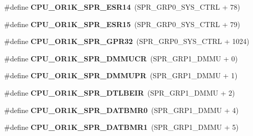 \begin{DoxyCompactItemize}
\item 
\mbox{\label{or1k-utility_8h_ad200a1bd430130a1178215266e691ea8}} 
\#define {\bfseries C\+P\+U\+\_\+\+O\+R1\+K\+\_\+\+S\+P\+R\+\_\+\+E\+S\+R14}~(S\+P\+R\+\_\+\+G\+R\+P0\+\_\+\+S\+Y\+S\+\_\+\+C\+T\+RL + 78)
\item 
\mbox{\label{or1k-utility_8h_aae305c736cae02eecc98ce655c6412f7}} 
\#define {\bfseries C\+P\+U\+\_\+\+O\+R1\+K\+\_\+\+S\+P\+R\+\_\+\+E\+S\+R15}~(S\+P\+R\+\_\+\+G\+R\+P0\+\_\+\+S\+Y\+S\+\_\+\+C\+T\+RL + 79)
\item 
\mbox{\label{or1k-utility_8h_a8c2ec7ea44f2972554cf9e69989b4008}} 
\#define {\bfseries C\+P\+U\+\_\+\+O\+R1\+K\+\_\+\+S\+P\+R\+\_\+\+G\+P\+R32}~(S\+P\+R\+\_\+\+G\+R\+P0\+\_\+\+S\+Y\+S\+\_\+\+C\+T\+RL + 1024)
\item 
\mbox{\label{or1k-utility_8h_a68d565f91b162e3b892d55a55a859e96}} 
\#define {\bfseries C\+P\+U\+\_\+\+O\+R1\+K\+\_\+\+S\+P\+R\+\_\+\+D\+M\+M\+U\+CR}~(S\+P\+R\+\_\+\+G\+R\+P1\+\_\+\+D\+M\+MU + 0)
\item 
\mbox{\label{or1k-utility_8h_a54928d2e3520c25bb92141f6c966e5f5}} 
\#define {\bfseries C\+P\+U\+\_\+\+O\+R1\+K\+\_\+\+S\+P\+R\+\_\+\+D\+M\+M\+U\+PR}~(S\+P\+R\+\_\+\+G\+R\+P1\+\_\+\+D\+M\+MU + 1)
\item 
\mbox{\label{or1k-utility_8h_af2166adfedafac9ec15799b6dc9978e9}} 
\#define {\bfseries C\+P\+U\+\_\+\+O\+R1\+K\+\_\+\+S\+P\+R\+\_\+\+D\+T\+L\+B\+E\+IR}~(S\+P\+R\+\_\+\+G\+R\+P1\+\_\+\+D\+M\+MU + 2)
\item 
\mbox{\label{or1k-utility_8h_a3c2dbd93afc35f4a6ccd83ec38405a8a}} 
\#define {\bfseries C\+P\+U\+\_\+\+O\+R1\+K\+\_\+\+S\+P\+R\+\_\+\+D\+A\+T\+B\+M\+R0}~(S\+P\+R\+\_\+\+G\+R\+P1\+\_\+\+D\+M\+MU + 4)
\item 
\mbox{\label{or1k-utility_8h_a77de4e217a9487eeec65414f4e014c43}} 
\#define {\bfseries C\+P\+U\+\_\+\+O\+R1\+K\+\_\+\+S\+P\+R\+\_\+\+D\+A\+T\+B\+M\+R1}~(S\+P\+R\+\_\+\+G\+R\+P1\+\_\+\+D\+M\+MU + 5)
\item 
\mbox{\label{or1k-utility_8h_a3fea98e9a608a0d0a5c192a1486f26c8}} 

\end{DoxyCompactItemize}
